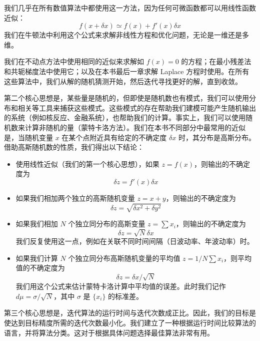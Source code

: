 \documentclass[justified, sixbynine]{tufte-book}
\theoremstyle{plain}%
\newtheorem * {corollary}{推论}
\theoremstyle{definition}
\theoremstyle{remark}
\newtheorem * {remark}{注记}
\newtheorem * {note}{注释}
\begin{document}
\begin{fullwidth}
我们几乎在所有数值算法中都使用这一方法，因为任何可微函数都可以用线性函数近似：
\begin{equation}
f(x+\delta x) \simeq f(x) + f'(x)\delta x
\end{equation}
我们在牛顿法中利用这个公式来求解非线性方程和优化问题，无论是一维还是多维。

我们在不动点方法中使用相同的近似来求解如 $f(x)=0$ 的方程；在最小残差法和共轭梯度法中使用它；以及在本书最后一章求解 Laplace 方程时使用。在所有这些算法中，我们从解的随机猜测开始，然后迭代寻找更好的解，直到收敛。

第二个核心思想是，某些量是随机的，但即使是随机数也有模式，我们可以使用分布和相关等工具来捕获这些模式。这些模式的存在帮助我们建模可能产生随机输出的系统（例如核反应、金融系统），也帮助我们的计算。事实上，我们可以使用随机数来计算非随机的量（蒙特卡洛方法）。我们在本书不同部分中最常用的近似是，当随机变量 $x$ 在某个点附近具有给定的不确定度 $\delta x$ 时，其分布是高斯分布。借助高斯随机数的性质，我们得出以下结论：
\begin{itemize}
\item 使用线性近似（我们的第一个核心思想），如果 $z=f(x)$，则输出的不确定度为
\begin{equation}
\delta z = f'(x) \delta x
\end{equation}
\item 如果我们相加两个独立的高斯随机变量 $z=x+y$，则输出的不确定度为
\begin{equation}
\delta z = \sqrt{\delta x^2 + \delta y^2}
\end{equation}
\item 如果我们相加 $N$ 个独立同分布的高斯变量 $z=\sum x_i$，则输出的不确定度为
\begin{equation}
\delta z = \sqrt{N}\delta x
\end{equation}
我们反复使用这一点，例如在关联不同时间间隔（日波动率、年波动率）时。
\item 如果我们计算 $N$ 个独立同分布高斯随机变量的平均值 $z=1/N \sum x_i$，则平均值的不确定度为
\begin{equation}
\delta z = \delta x/\sqrt{N}
\end{equation}
我们用这个公式来估计蒙特卡洛计算中平均值的误差。此时我们记作 $d\mu = \sigma/\sqrt{N}$，其中 $\sigma$ 是 $\{ x_i\}$ 的标准差。
\end{itemize}

第三个核心思想是，迭代算法的运行时间与迭代次数成正比。因此，我们的目标是使达到目标精度所需的迭代次数最小化。我们建立了一种根据运行时间比较算法的语言，并将算法分类。这对于根据具体问题选择最佳算法非常有用。


\end{fullwidth}
\end{document}
